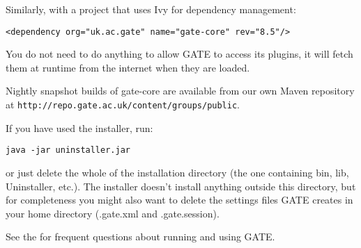 Similarly, with a project that uses Ivy for dependency management:
\begin{small}
\begin{verbatim}
<dependency org="uk.ac.gate" name="gate-core" rev="8.5"/>
\end{verbatim}
\end{small}

You do not need to do anything to allow GATE to access its plugins, it will
fetch them at runtime from the internet when they are loaded.

Nightly snapshot builds of gate-core are available from our own Maven
repository at \verb|http://repo.gate.ac.uk/content/groups/public|.


If you have used the installer, run:

\begin{small}
\begin{verbatim}
java -jar uninstaller.jar
\end{verbatim}
\end{small}

or just delete the whole of the installation directory (the one containing
bin, lib, Uninstaller, etc.). The installer doesn't install anything outside
this directory, but for completeness you might also want to delete the
settings files GATE creates in your home directory (.gate.xml and
.gate.session).


See the  for frequent questions about running and using GATE.

